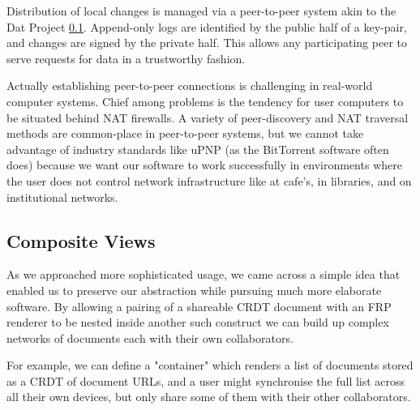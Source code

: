 \documentclass[sigplan,10pt]{acmart}
\begin{document}
Distribution of local changes is managed via a peer-to-peer system akin to the Dat Project \ref{}. Append-only logs are identified by the public half of a key-pair, and changes are signed by the private half. This allows any participating peer to serve requests for data in a trustworthy fashion.  

Actually establishing peer-to-peer connections is challenging in real-world computer systems. Chief among problems is the tendency for user computers to be situated behind NAT firewalls. A variety of peer-discovery and NAT traversal methods are common-place in peer-to-peer systems, but we cannot take advantage of industry standards like uPNP (as the BitTorrent software often does) because we want our software to work successfully in environments where the user does not control network infrastructure like at cafe's, in libraries, and on institutional networks.


\subsection{Composite Views}

As we approached more sophisticated usage, we came across a simple idea that enabled us to preserve our abstraction while pursuing much more elaborate software. By allowing a pairing of a shareable CRDT document with an FRP renderer to be nested inside another such construct we can build up complex networks of documents each with their own collaborators.

For example, we can define a "container" which renders a list of documents stored as a CRDT of document URLs, and a user might synchronise the full list across all their own devices, but only share some of them with their other collaborators.
\end{document}
